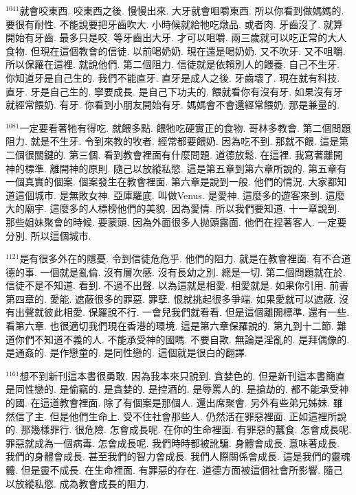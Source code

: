\documentclass{book}
\begin{document}
$^{1041}$就會咬東西.
咬東西之後.
慢慢出來.
大牙就會咀嚼東西.
所以你看到做媽媽的.
要很有耐性.
不能說要把牙齒吹大.
小時候就給牠吃燉品.
或者肉.
牙齒沒了.
就算開始有牙齒.
最多只是咬.
等牙齒出大牙.
才可以咀嚼.
兩三歲就可以吃正常的大人食物.
但現在這個教會的信徒.
以前喝奶奶.
現在還是喝奶奶.
又不吹牙.
又不咀嚼.
所以保羅在這裡.
就說他們.
第二個阻力.
信徒就是依賴別人的餵養.
自己不生牙.
你知道牙是自己生的.
我們不能直牙.
直牙是成人之後.
牙齒壞了.
現在就有科技.
直牙.
牙是自己生的.
寧要成長.
是自己下功夫的.
餵就看你有沒有牙.
如果沒有牙就經常餵奶.
有牙.
你看到小朋友開始有牙.
媽媽會不會還經常餵奶.
那是兼量的.

$^{1081}$一定要看著牠有得吃.
就餵多點.
餵牠吃硬實正的食物.
哥林多教會.
第二個問題阻力.
就是不生牙.
令到來教的牧者.
經常都要餵奶.
因為吃不到.
那就不餵.
這是第二個很關鍵的.
第三個.
看到教會裡面有什麼問題.
道德放鬆.
在這裡.
我寫著離開神的標準.
離開神的原則.
隨己以放縱私慾.
這是第五章到第六章所說的.
第五章有一個真實的個案.
個案發生在教會裡面.
第六章是說到一般.
他們的情況.
大家都知道這個城市.
是無敗女神.
亞庫羅底.
叫做Venus.
是愛神.
這麼多的遊客來到.
這麼大的廟宇.
這麼多的人標榜他們的美貌.
因為愛情.
所以我們要知道.
十一章說到.
那些姐妹聚會的時候.
要蒙頭.
因為外面很多人拋頭露面.
他們在捏著客人.
一定要分別.
所以這個城市.

$^{1121}$是有很多外在的隱憂.
令到信徒危危乎.
他們的阻力.
就是在教會裡面.
有不合道德的事.
一個就是亂倫.
沒有層次感.
沒有長幼之別.
總是一切.
第二個問題就在於.
信徒不是不知道.
看到.
不過不出聲.
以為這就是相愛.
相愛就是.
如果你引用.
前書第四章的.
愛能.
遮蔽很多的罪惡.
罪孽.
恨就挑起很多爭端.
如果愛就可以遮蔽.
沒有出聲就彼此相愛.
保羅說不行.
一會兒我們就看看.
但是這個離開標準.
還有一些.
看第六章.
也很適切我們現在香港的環境.
這是第六章保羅說的.
第九到十二節.
難道你們不知道不義的人.
不能承受神的國嗎.
不要自欺.
無論是淫亂的.
是拜偶像的.
是通姦的.
是作戀童的.
是同性戀的.
這個就是很白的翻譯.

$^{1161}$想不到新刊這本書很勇敢.
因為我本來只說到.
貪婪色的.
但是新刊這本書簡直是同性戀的.
是偷竊的.
是貪婪的.
是控酒的.
是辱罵人的.
是搶劫的.
都不能承受神的國.
在這道教會裡面.
除了有個案是那個人.
還出席聚會.
另外有些弟兄姊妹.
雖然信了主.
但是他們生命上.
受不住社會那些人.
仍然活在罪惡裡面.
正如這裡所說的.
那幾樣罪行.
很危險.
怎會成長呢.
在你的生命裡面.
有罪惡的蠶食.
怎會成長呢.
罪惡就成為一個病毒.
怎會成長呢.
我們時時都被訛騙.
身體會成長.
意味著成長.
我們的身體會成長.
甚至我們的智力會成長.
我們人際關係會成長.
這是我們的靈魂體.
但是靈不成長.
在生命裡面.
有罪惡的存在.
道德方面被這個社會所影響.
隨己以放縱私慾.
成為教會成長的阻力.
\end{document}
